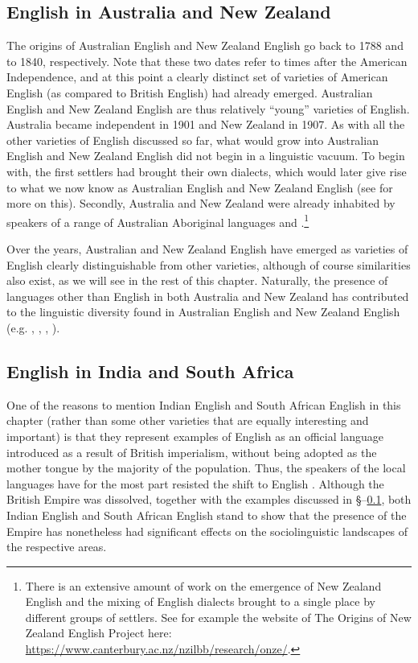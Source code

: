 \subsection{English in Australia and New Zealand}\label{English-AU-NZ}
The origins of Australian English and New Zealand English go back to 1788 and to 1840, respectively. Note that these two dates refer to times after the American Independence, and at this point a clearly distinct set of varieties of American English (as compared to British English) had already emerged. Australian English and New Zealand English are thus relatively ``young'' varieties of English. Australia became independent in 1901 and New Zealand in 1907. As with all the other varieties of English discussed so far, what would grow into Australian English and New Zealand English did not begin in a linguistic vacuum. To begin with, the first settlers had brought their own dialects, which would later give rise to what we now know as Australian English and New Zealand English (see  for more on this). Secondly, Australia and New Zealand were already inhabited by speakers of a range of Australian Aboriginal languages and .\footnote{There is an extensive amount of work on the emergence of New Zealand English and the mixing of English dialects brought to a single place by different groups of settlers. See for example the website of The Origins of New Zealand English Project here: \url{https://www.canterbury.ac.nz/nzilbb/research/onze/}.}

Over the years, Australian and New Zealand English have emerged as varieties of English clearly distinguishable from other varieties, although of course similarities also exist, as we will see in the rest of this chapter. Naturally, the presence of languages other than English in both Australia and New Zealand has contributed to the linguistic diversity found in Australian English and New Zealand English (e.g. \citealp{Butcher2008}, \citealp{DArcy2010}, \citealp{Eisikovits1996}, \citealp{Louro2013}).

\subsection{English in India and South Africa}\label{English-I-SA}
One of the reasons to mention Indian English and South African English in this chapter (rather than some other varieties that are equally interesting and important) is that they represent examples of English as an official language introduced as a result of British imperialism, without being adopted as the mother tongue by the majority of the population. Thus, the speakers of the local languages have for the most part resisted the shift to English \citep{Mesthrie2015}. Although the British Empire was dissolved, together with the examples discussed in §--\ref{English-AU-NZ}, both Indian English and South African English stand to show that the presence of the Empire has nonetheless had significant effects on the sociolinguistic landscapes of the respective areas.

